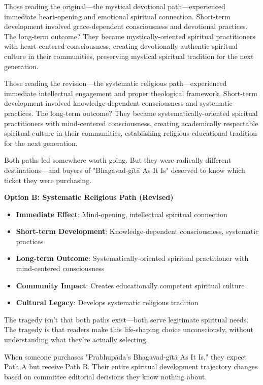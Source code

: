 \documentclass[12pt,twoside]{book}
\begin{document}
Those reading the original—the mystical devotional path—experienced immediate heart-opening and emotional spiritual connection. Short-term development involved grace-dependent consciousness and devotional practices. The long-term outcome? They became mystically-oriented spiritual practitioners with heart-centered consciousness, creating devotionally authentic spiritual culture in their communities, preserving mystical spiritual tradition for the next generation.

Those reading the revision—the systematic religious path—experienced immediate intellectual engagement and proper theological framework. Short-term development involved knowledge-dependent consciousness and systematic practices. The long-term outcome? They became systematically-oriented spiritual practitioners with mind-centered consciousness, creating academically respectable spiritual culture in their communities, establishing religious educational tradition for the next generation.

Both paths led somewhere worth going. But they were radically different destinations—and buyers of "Bhagavad-gītā As It Is" deserved to know which ticket they were purchasing.

\textbf{\textbf{Option B: Systematic Religious Path (Revised)}}
\begin{itemize}
\item \textbf{\textbf{Immediate Effect}}: Mind-opening, intellectual spiritual connection
\item \textbf{\textbf{Short-term Development}}: Knowledge-dependent consciousness, systematic practices
\item \textbf{\textbf{Long-term Outcome}}: Systematically-oriented spiritual practitioner with mind-centered consciousness
\item \textbf{\textbf{Community Impact}}: Creates educationally competent spiritual culture
\item \textbf{\textbf{Cultural Legacy}}: Develops systematic religious tradition
\end{itemize}

The tragedy isn't that both paths exist—both serve legitimate spiritual needs. The tragedy is that readers make this life-shaping choice unconsciously, without understanding what they're actually selecting.

When someone purchases "Prabhupāda's Bhagavad-gītā As It Is," they expect Path A but receive Path B. Their entire spiritual development trajectory changes based on committee editorial decisions they know nothing about.
\end{document}
